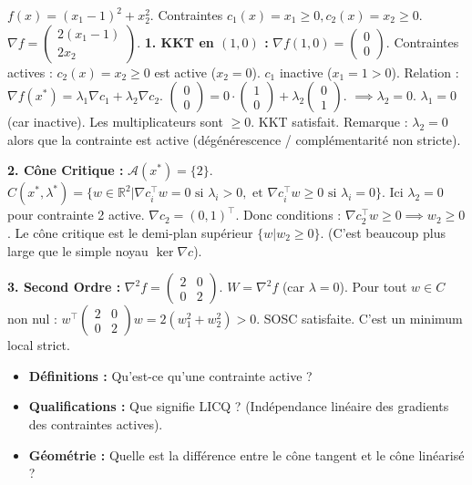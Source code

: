 \begin{correction}
$f(x) = (x_1-1)^2 + x_2^2$. Contraintes $c_1(x) = x_1 \ge 0, c_2(x) = x_2 \ge 0$.
$\nabla f = \begin{pmatrix} 2(x_1-1) \\ 2x_2 \end{pmatrix}$.
\textbf{1. KKT en $(1,0)$ :}
$\nabla f(1,0) = \begin{pmatrix} 0 \\ 0 \end{pmatrix}$.
Contraintes actives : $c_2(x) = x_2 \ge 0$ est active ($x_2=0$). $c_1$ inactive ($x_1=1 > 0$).
Relation : $\nabla f(x^*) = \lambda_1 \nabla c_1 + \lambda_2 \nabla c_2$.
$\begin{pmatrix} 0 \\ 0 \end{pmatrix} = 0 \cdot \begin{pmatrix} 1 \\ 0 \end{pmatrix} + \lambda_2 \begin{pmatrix} 0 \\ 1 \end{pmatrix}$.
$\implies \lambda_2 = 0$. $\lambda_1=0$ (car inactive).
Les multiplicateurs sont $\ge 0$. KKT satisfait.
Remarque : $\lambda_2 = 0$ alors que la contrainte est active (dégénérescence / complémentarité non stricte).

\textbf{2. Cône Critique :}
$\mathcal{A}(x^*) = \{2\}$.
$C(x^*, \lambda^*) = \{ w \in \mathbb{R}^2 | \nabla c_i^\top w = 0 \text{ si } \lambda_i > 0, \text{ et } \nabla c_i^\top w \ge 0 \text{ si } \lambda_i = 0 \}$.
Ici $\lambda_2 = 0$ pour contrainte 2 active.
$\nabla c_2 = (0, 1)^\top$.
Donc conditions : $\nabla c_2^\top w \ge 0 \implies w_2 \ge 0$.
Le cône critique est le demi-plan supérieur $\{ w | w_2 \ge 0 \}$.
(C'est beaucoup plus large que le simple noyau $\ker \nabla c$).

\textbf{3. Second Ordre :}
$\nabla^2 f = \begin{pmatrix} 2 & 0 \\ 0 & 2 \end{pmatrix}$. $W = \nabla^2 f$ (car $\lambda=0$).
Pour tout $w \in C$ non nul : $w^\top \begin{pmatrix} 2 & 0 \\ 0 & 2 \end{pmatrix} w = 2(w_1^2 + w_2^2) > 0$.
SOSC satisfaite. C'est un minimum local strict.
\end{correction}
\bigskip

\bigskip
\begin{checkpoint}
\begin{itemize}
    \item \textbf{Définitions :} Qu'est-ce qu'une contrainte active ?
    \item \textbf{Qualifications :} Que signifie LICQ ? (Indépendance linéaire des gradients des contraintes actives).
    \item \textbf{Géométrie :} Quelle est la différence entre le cône tangent et le cône linéarisé ?
\end{itemize}
\end{checkpoint}

